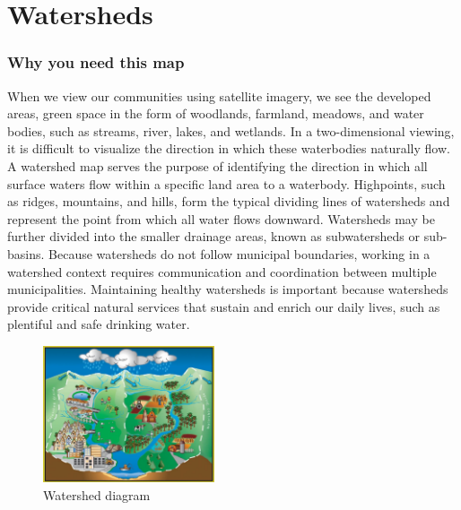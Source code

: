\chapter{Watersheds}\label{subsec:watersheds}
\subsection*{Why you need this map}
When we view our communities using satellite imagery, we see the developed 
areas, green space in the form of woodlands, farmland, meadows, and water 
bodies, such as streams, river, lakes, and wetlands. In a two-dimensional 
viewing, it is difficult to visualize the direction in which these waterbodies 
naturally flow. A watershed map serves the purpose of identifying the direction 
in which all surface waters flow within a specific land area to a waterbody. 
Highpoints, such as ridges, mountains, and hills, form the typical dividing 
lines of watersheds and represent the point from which all water flows 
downward. Watersheds may be further divided into the smaller drainage areas, 
known as subwatersheds or sub-basins. Because watersheds do not follow 
municipal boundaries, working in a watershed context requires communication and 
coordination between multiple municipalities. Maintaining healthy watersheds is 
important because watersheds provide critical natural services that sustain and 
enrich our daily lives, such as plentiful and safe drinking water.

\begin{figure}
  \centering
    \includegraphics[width=0.45\textwidth]{images/watershed_riveralliance.jpg}
  \caption{Watershed diagram}\label{fig:watershed}
  \vspace{-20pt}
\end{figure}

